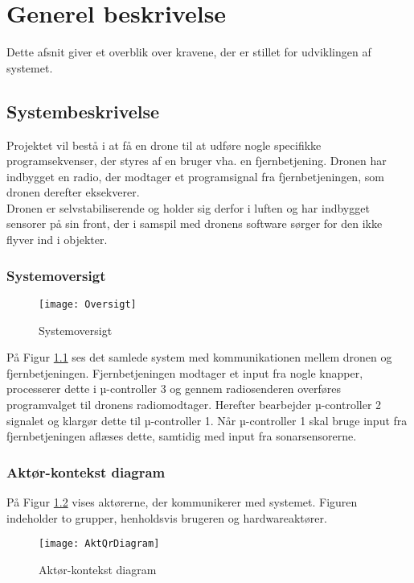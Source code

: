 \documentclass[Main]{subfiles}
\begin{document}
\chapter{Generel beskrivelse}
Dette afsnit giver et overblik over kravene, der er stillet for udviklingen af systemet.

\section{Systembeskrivelse}
Projektet vil bestå i at få en drone til at udføre nogle specifikke programsekvenser, der styres af en bruger vha. en fjernbetjening.
Dronen har indbygget en radio, der modtager et programsignal fra fjernbetjeningen, som dronen derefter eksekverer.
\\
Dronen er selvstabiliserende og holder sig derfor i luften og har indbygget sensorer på sin front, der i samspil med dronens software sørger for den ikke flyver ind i objekter.


\subsection{Systemoversigt}

\begin{figure}[H]
\centering
\texttt{[image: Oversigt]}
\caption{Systemoversigt}
\label{Fig:Oversigt}
\end{figure}

På Figur \ref{Fig:Oversigt} ses det samlede system med kommunikationen mellem dronen og fjernbetjeningen.
Fjernbetjeningen modtager et input fra nogle knapper, processerer dette i µ-controller 3 og gennem radiosenderen overføres programvalget til dronens radiomodtager.
Herefter bearbejder µ-controller 2 signalet og klargør dette til µ-controller 1.
Når µ-controller 1 skal bruge input fra fjernbetjeningen aflæses dette, samtidig med input fra sonarsensorerne.



\subsection{Aktør-kontekst diagram}

På Figur \ref{Fig:Aktor-oversigt} vises aktørerne, der kommunikerer med systemet.
Figuren indeholder to grupper, henholdsvis brugeren og hardwareaktører.


\begin{figure}[H]
\centering
\texttt{[image: AktQrDiagram]}
\caption{Aktør-kontekst diagram}
\label{Fig:Aktor-oversigt}
\end{figure}
\end{document}
